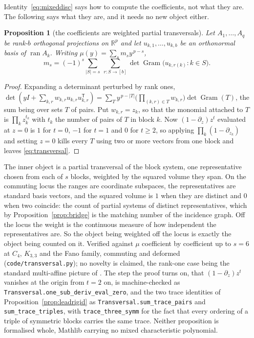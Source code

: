 \documentclass[11pt]{article}
\newtheorem{proposition}[theorem]{Proposition}
\theoremstyle{remark}
\begin{document}
Identity~\eqref{eq:mixeddisc} says how to compute the coefficients, not what they are. The following
says what they are, and it needs no new object either.

\begin{proposition}[the coefficients are weighted partial transversals]\label{prop:transversal}
Let $A_1,\dots,A_q$ be rank-$b$ orthogonal projections on $\mathbb R^p$ and let
$u_{k,1},\dots,u_{k,b}$ be an orthonormal basis of $\operatorname{ran}A_k$. Writing
$\mu(y)=\sum_sm_sy^{\,p-s}$,
\begin{equation}\label{eq:transversal}
m_s=(-1)^s\sum_{|S|=s}\ \sum_{r:S\to[b]}\det\operatorname{Gram}\bigl(u_{k,r(k)}:k\in S\bigr).
\end{equation}
\end{proposition}

\begin{proof}
Expanding a determinant perturbed by rank ones,
$\det(yI+\sum_{k,r}w_{k,r}u_{k,r}u_{k,r}^{\mathsf T})
=\sum_Ty^{\,p-|T|}\bigl(\prod_{(k,r)\in T}w_{k,r}\bigr)\det\operatorname{Gram}(T)$,
the sum being over sets $T$ of pairs. Put $w_{k,r}=z_k$, so that the monomial attached to $T$ is
$\prod_kz_k^{t_k}$ with $t_k$ the number of pairs of $T$ in block $k$. Now
$(1-\partial_z)z^t$ evaluated at $z=0$ is $1$ for $t=0$, $-1$ for $t=1$ and $0$ for $t\ge2$, so
applying $\prod_k(1-\partial_{z_k})$ and setting $z=0$ kills every $T$ using two or more vectors from
one block and leaves \eqref{eq:transversal}.
\end{proof}

The inner object is a partial transversal of the block system, one representative chosen from each of
$s$ blocks, weighted by the squared volume they span. On the commuting locus the ranges are
coordinate subspaces, the representatives are standard basis vectors, and the squared volume is $1$
when they are distinct and $0$ when two coincide: the count of partial systems of distinct
representatives, which by Proposition~\ref{prop:bridge} is the matching number of the incidence graph.
Off the locus the weight is the continuous measure of how independent the representatives are. So the
object being weighted off the locus is exactly the object being counted on it. Verified against $\mu$
coefficient by coefficient up to $s=6$ at $C_4$, $K_{3,3}$ and the Fano family, commuting and
deformed (\texttt{code/transversal.py}); no novelty is claimed, the rank-one case being the standard
multi-affine picture of \cite{MSS}. The step the proof turns on, that $(1-\partial_z)z^t$ vanishes at
the origin from $t=2$ on, is machine-checked as
\texttt{Transversal.one\_sub\_deriv\_eval\_zero}, and the two trace identities of
Proposition~\ref{prop:leadrigid} as \texttt{Transversal.sum\_trace\_pairs} and
\texttt{sum\_trace\_triples}, with \texttt{trace\_three\_symm} for the fact that every ordering of a
triple of symmetric blocks carries the same trace. Neither proposition is formalised whole, Mathlib
carrying no mixed characteristic polynomial.
\end{document}
